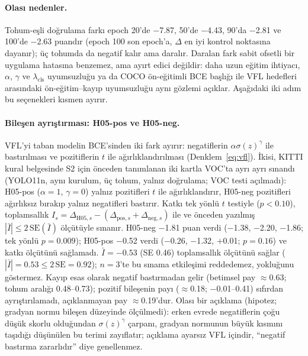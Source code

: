 \documentclass[pdflatex,iicol,sn-mathphys-num]{sn-jnl}
\begin{document}
\paragraph{Olası nedenler.}
Tohum-eşli doğrulama farkı epoch 20'de $-$7.87, 50'de $-$4.43, 90'da $-$2.81 ve 100'de $-$2.63 puandır (epoch 100 son epoch'a, $\Delta$ en iyi kontrol noktasına dayanır); üç tohumda da negatif kalır ama daralır. Daralan fark sabit ofsetli bir uygulama hatasına benzemez, ama ayırt edici değildir: daha uzun eğitim ihtiyacı, $\alpha$, $\gamma$ ve $\lambda_{\mathrm{cls}}$ uyumsuzluğu ya da COCO ön-eğitimli BCE başlığı ile VFL hedefleri arasındaki ön-eğitim--kayıp uyumsuzluğu aynı gözlemi açıklar. Aşağıdaki iki adım bu seçenekleri kısmen ayırır.

\paragraph{Bileşen ayrıştırması: H05-pos ve H05-neg.}\label{sec:h05-mekanizma}
VFL'yi taban modelin BCE'sinden iki fark ayırır: negatiflerin $\alpha\sigma(z)^\gamma$ ile bastırılması ve pozitiflerin $t$ ile ağırlıklandırılması (Denklem~\eqref{eq:vfl}). İkisi, KITTI kural belgesinde S2 için önceden tanımlanan iki kartla VOC'ta ayrı ayrı sınandı (YOLO11n, aynı kurulum, üç tohum, yalnız doğrulama; VOC testi açılmadı): H05-pos ($\alpha=1$, $\gamma=0$) yalnız pozitifleri $t$ ile ağırlıklandırır, H05-neg pozitifleri ağırlıksız bırakıp yalnız negatifleri bastırır. Katkı tek yönlü $t$ testiyle ($p<0.10$), toplamsallık $I_s=\Delta_{\mathrm{H05},s}-(\Delta_{\mathrm{pos},s}+\Delta_{\mathrm{neg},s})$ ile ve önceden yazılmış $|\bar I|\le2\,\mathrm{SE}(\bar I)$ ölçütüyle sınanır. H05-neg $-$1.81 puan verdi ($-$1.38, $-$2.20, $-$1.86; tek yönlü $p=0.009$); H05-pos $-$0.52 verdi ($-$0.26, $-$1.32, +0.01; $p=0.16$) ve katkı ölçütünü sağlamadı. $\bar I=-0.53$ (SE 0.46) toplamsallık ölçütünü sağlar ($|\bar I|=0.53\le2\,\mathrm{SE}=0.92$); $n=3$'te bu sınama etkileşimi reddedemez, yokluğunu göstermez. Kayıp esas olarak negatif bastırmadan gelir (betimsel pay $\approx$0.63; tohum aralığı 0.48--0.73); pozitif bileşenin payı ($\approx$0.18; $-$0.01--0.41) sıfırdan ayrıştırılamadı, açıklanmayan pay $\approx$0.19'dur. Olası bir açıklama (hipotez; gradyan normu bileşen düzeyinde ölçülmedi): erken evrede negatiflerin çoğu düşük skorlu olduğundan $\sigma(z)^\gamma$ çarpanı, gradyan normunun büyük kısmını taşıdığı düşünülen bu terimi zayıflatır; açıklama ayarsız VFL içindir, ``negatif bastırma zararlıdır'' diye genellenmez.
\end{document}
